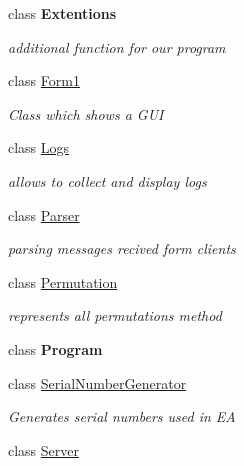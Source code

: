 \begin{DoxyCompactItemize}
class {\bfseries Extentions}
\begin{DoxyCompactList}\small\item\em additional function for our program \end{DoxyCompactList}\item 
class \hyperlink{class_election_authority_1_1_form1}{Form1}
\begin{DoxyCompactList}\small\item\em Class which shows a G\+U\+I \end{DoxyCompactList}\item 
class \hyperlink{class_election_authority_1_1_logs}{Logs}
\begin{DoxyCompactList}\small\item\em allows to collect and display logs \end{DoxyCompactList}\item 
class \hyperlink{class_election_authority_1_1_parser}{Parser}
\begin{DoxyCompactList}\small\item\em parsing messages recived form clients \end{DoxyCompactList}\item 
class \hyperlink{class_election_authority_1_1_permutation}{Permutation}
\begin{DoxyCompactList}\small\item\em represents all permutation\textquotesingle{}s method \end{DoxyCompactList}\item 
class {\bfseries Program}
\item 
class \hyperlink{class_election_authority_1_1_serial_number_generator}{Serial\+Number\+Generator}
\begin{DoxyCompactList}\small\item\em Generates serial numbers used in E\+A \end{DoxyCompactList}\item 
class \hyperlink{class_election_authority_1_1_server}{Server}
\end{DoxyCompactItemize}
